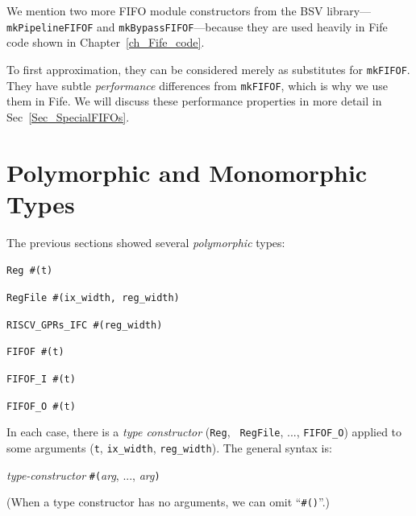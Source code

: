 We mention two more FIFO module constructors from the BSV library---
{\tt mkPipelineFIFOF} and {\tt mkBypassFIFOF}---because they are used
heavily in Fife code shown in Chapter~\ref{ch_Fife_code}.

To first approximation, they can be considered merely as substitutes
for {\tt mkFIFOF}.  They have subtle \emph{performance} differences
from {\tt mkFIFOF}, which is why we use them in Fife.  We will discuss
these performance properties in more detail in
Sec~\ref{Sec_SpecialFIFOs}.


\section{Polymorphic and Monomorphic Types}

\label{Sec_Polymorphic_Types}



The previous sections showed several \emph{polymorphic} types:

{\small
\begin{tightlist}
 \item \verb|Reg #(t)|
 \item \verb|RegFile #(ix_width, reg_width)|
 \item \verb|RISCV_GPRs_IFC #(reg_width)|
 \item \verb|FIFOF #(t)|
 \item \verb|FIFOF_I #(t)|
 \item \verb|FIFOF_O #(t)|
\end{tightlist}
}

In each case, there is a \emph{type constructor} ({\tt Reg}, {\tt
RegFile}, ..., {\tt FIFOF\_O}) applied to some arguments ({\tt t},
{\tt ix\_width}, {\tt reg\_width}).  The general syntax is:

\begin{tabbing}
\hmm \emph{type-constructor} {\tt \#(}\emph{arg}, ..., \emph{arg}{\tt )}
\end{tabbing}

(When a type constructor has no arguments, we can omit ``{\tt \#()}''.)

